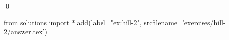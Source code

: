
\begin{ex} 
  \label{ex:hill-2}
  
  \qed
\end{ex} 
\begin{python0}
from solutions import *
add(label="ex:hill-2",
    srcfilename='exercises/hill-2/answer.tex') 
\end{python0}
